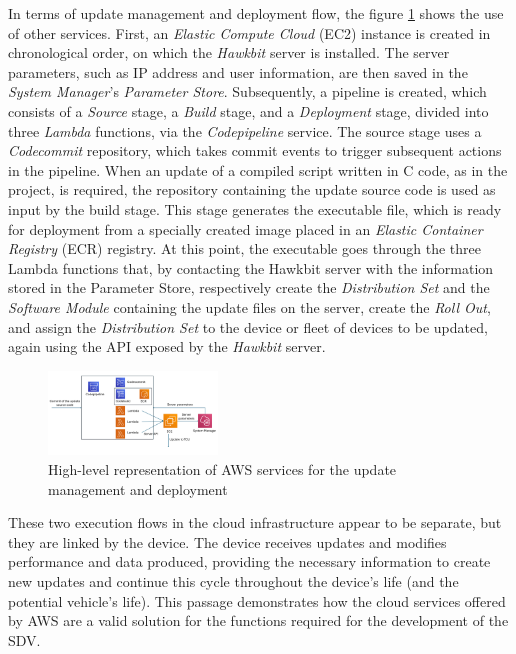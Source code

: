 \documentclass[10pt,a4paper,roman, twocolumn]{article}
\begin{document}
In terms of update management and deployment flow, the figure \ref{fig:AWSUpdateServices} shows the use of other services. First, an \textit{Elastic Compute Cloud} (EC2) instance is created in chronological order, on which the \textit{Hawkbit} server is installed. The server parameters, such as IP address and user information, are then saved in the \textit{System Manager}'s \textit{Parameter Store}. Subsequently, a pipeline is created, which consists of a \textit{Source} stage, a \textit{Build} stage, and a \textit{Deployment} stage, divided into three \textit{Lambda} functions, via the \textit{Codepipeline} service. The source stage uses a \textit{Codecommit} repository, which takes commit events to trigger subsequent actions in the pipeline. When an update of a compiled script written in C code, as in the project, is required, the repository containing the update source code is used as input by the build stage. This stage generates the executable file, which is ready for deployment from a specially created image placed in an \textit{Elastic Container Registry} (ECR) registry. At this point, the executable goes through the three Lambda functions that, by contacting the Hawkbit server with the information stored in the Parameter Store, respectively create the \textit{Distribution Set} and the \textit{Software Module} containing the update files on the server, create the \textit{Roll Out}, and assign the \textit{Distribution Set} to the device or fleet of devices to be updated, again using the API exposed by the \textit{Hawkbit} server.
\begin{figure} [tbh]
	\centerline{\includegraphics[width=0.4\textwidth]{images/AWS_update_services.png}}
	\caption{High-level representation of AWS services for the update management and deployment}
	\label{fig:AWSUpdateServices}
\end{figure}

These two execution flows in the cloud infrastructure appear to be separate, but they are linked by the device. The device receives updates and modifies performance and data produced, providing the necessary information to create new updates and continue this cycle throughout the device's life (and the potential vehicle's life). This passage demonstrates how the cloud services offered by AWS are a valid solution for the functions required for the development of the SDV.
\end{document}
